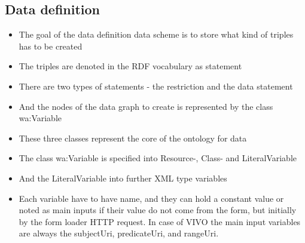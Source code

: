 






\subsection{Data definition}

\begin{itemize}
	\item The goal of the data definition data scheme is to store what kind of triples has to be created
	\item The triples are denoted in the RDF vocabulary as statement
\end{itemize}

\begin{itemize}
	\item There are two types of statements - the restriction and the data statement
	\item And the nodes of the data graph to create is represented by the class \\
	wa:Variable
	\item These three classes represent the core of the ontology for data
\end{itemize}

\begin{itemize}
	\item The class wa:Variable is specified into Resource-, Class- and LiteralVariable
	\item And the LiteralVariable into further XML type variables	
	\item Each variable have to have name, and they can hold a constant value or noted as main inputs
	if their value do not come from the form, but initially by the form loader HTTP request. In case of VIVO the
	main input variables are always the subjectUri, predicateUri, and rangeUri.
\end{itemize}

